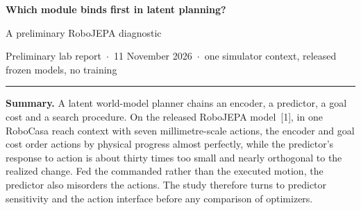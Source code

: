 \documentclass[10pt]{article}
\begin{document}
{\sffamily\bfseries\LARGE Which module binds first in latent planning?\par}
\vspace{2pt}
{\sffamily\large A preliminary RoboJEPA diagnostic\par}
\vspace{3pt}
{\sffamily\small\color{mute} Preliminary lab report \,$\cdot$\, 11 November 2026 \,$\cdot$\, one simulator context, released frozen models, no training\par}
\vspace{4pt}\hrule\vspace{5pt}

\textbf{Summary.} A latent world-model planner chains an encoder, a predictor, a goal cost and a search
procedure. On the released RoboJEPA model~[1], in one RoboCasa reach context with seven millimetre-scale
actions, the encoder and goal cost order actions by physical progress almost perfectly, while the predictor's
response to action is about thirty times too small and nearly orthogonal to the realized change. Fed the
commanded rather than the executed motion, the predictor also misorders the actions. The study therefore
turns to predictor sensitivity and the action interface before any comparison of optimizers.
\end{document}
